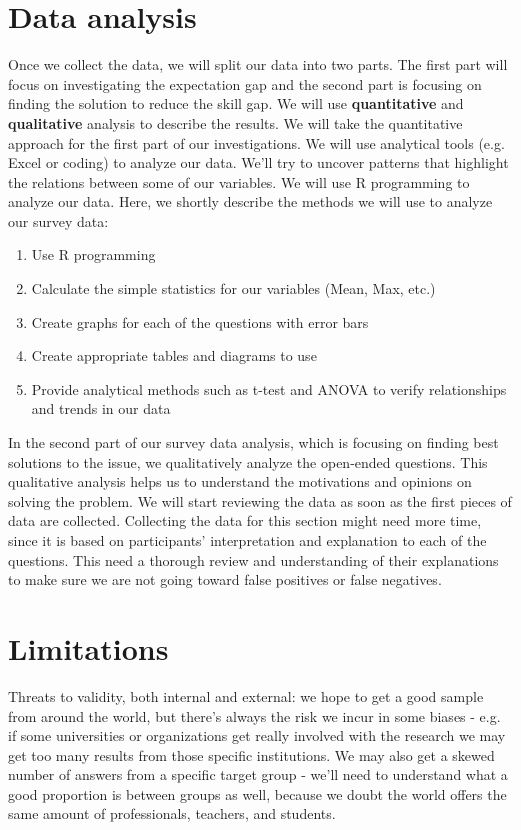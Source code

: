 \documentclass{sigchi}
\begin{document}
 \section{Data analysis}
 Once we collect the data, we will split our data into two parts. The first part will focus on investigating the expectation gap and the second part is focusing on finding the solution to reduce the skill gap. We will use \textbf{quantitative} and \textbf{qualitative} analysis to describe the results. We will take the quantitative approach for the first part of our investigations. We will use analytical tools (e.g. Excel or coding) to analyze our data. We'll try to uncover patterns that highlight the relations between some of our variables. We will use R programming to analyze our data. Here, we shortly describe the methods we will use to analyze our survey data:
\begin{enumerate}
	\item Use R programming
	\item Calculate the simple statistics for our variables (Mean, Max, etc.)
	\item Create graphs for each of the questions with error bars
	\item Create appropriate tables and diagrams to use
	\item Provide analytical methods such as t-test and ANOVA to verify relationships and trends in our data
\end{enumerate}
 In the second part of our survey data analysis, which is focusing on finding best solutions to the issue, we qualitatively analyze the open-ended questions. This qualitative analysis helps us to understand the motivations and opinions on solving the problem. We will start reviewing the data as soon as the first pieces of data are collected. Collecting the data for this section might need more time, since it is based on participants' interpretation and explanation to each of the questions. This need a thorough review and understanding of their explanations to make sure we are not going toward false positives or false negatives.

 
 \section{Limitations}
 Threats to validity, both internal and external: we hope to get a good sample from around the world, but there's always the risk we incur in some biases - e.g. if some universities or organizations get really involved with the research we may get too many results from those specific institutions. We may also get a skewed number of answers from a specific target group - we'll need to understand what a good proportion is between groups as well, because we doubt the world offers the same amount of professionals, teachers, and students.
 
\end{document}
